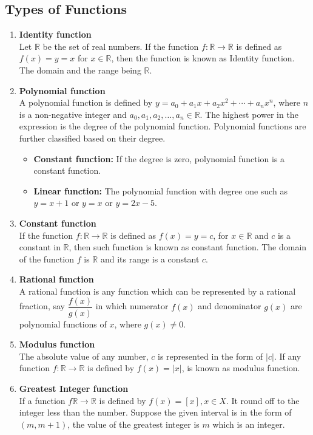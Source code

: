 \documentclass[12pt]{report}
\newcommand{\bt}[1]{\textbf{#1}}
\newcommand{\real}{ \mathbb{R}}
\begin{document}
	\subsection{Types of Functions}
	\begin{enumerate}
		\item \bt{Identity function}\\
		Let $\real$ be the set of real numbers. If the function $f:\real\rightarrow\real$ is defined as $f(x)=y=x$ for $x\in \real$, then the function is known as Identity function. The domain  and the range being $\real$.
		
		\item \bt{Polynomial function}\\
		A polynomial function is defined by $y=a_0 + a_1x + a_2x^2 + \cdots + a_nx^n$, where $n$ is a non-negative integer and $a_0, a_1, a_2,\ldots,a_n \in \real$. The highest power in the expression is the degree of the polynomial function. Polynomial functions are further classified based on their degree.
		\begin{itemize}
			\item \bt{Constant function:} If the degree is zero, polynomial function is a constant function.
			\item \bt{Linear function:} The polynomial function with degree one such as $y=x+1$ or $y=x$ or $y=2x-5$.
		\end{itemize}
	
		\item \bt{Constant function}\\
		If the function $f:\real\rightarrow\real$ is defined as $f(x)=y=c$, for $x\in\real$ and $c$ is a constant in $\real$, then such function is known as constant function. The domain of the function $f$ is $\real$ and its range is a constant $c$.
	
		\item \bt{Rational function}\\
		A rational function is any function which can be represented by a rational fraction, say $\dfrac{f(x)}{g(x)}$ in which numerator $f(x)$ and denominator $g(x)$ are polynomial functions of $x$, where $g(x) \neq 0$.
		
		\item \bt{Modulus function}\\
		The absolute value of any number, $c$ is represented in the form of $|c|$. If any function $f:\real\rightarrow\real$ is defined by $f(x)=|x|$, is known as modulus function.
		
		\item \bt{Greatest Integer function}\\
		If a function $f\real\rightarrow\real$ is defined by $f(x)=[x], x\in X$. It round off to the integer less than the number. Suppose the given interval is in the form of $(m,m+1)$, the value of the greatest integer is $m$ which is an integer.
		

\end{enumerate}
\end{document}
